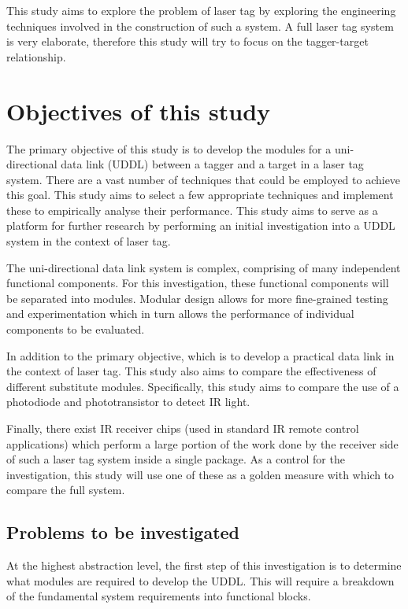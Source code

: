 This study aims to explore the problem of laser tag by exploring the engineering techniques involved in the construction of such a system. A full laser tag system is very elaborate, therefore this study will try to focus on the tagger-target relationship.

\section{Objectives of this study}

The primary objective of this study is to develop the modules for a uni-directional data link (UDDL) between a tagger and a target in a laser tag system. There are a vast number of techniques that could be employed to achieve this goal. This study aims to select a few appropriate techniques and implement these to empirically analyse their performance. This study aims to serve as a platform for further research by performing an initial investigation into a UDDL system in the context of laser tag.

The uni-directional data link system is complex, comprising of many independent functional components. For this investigation, these functional components will be separated into modules. Modular design allows for more fine-grained testing and experimentation which in turn allows the performance of individual components to be evaluated.

In addition to the primary objective, which is to develop a practical data link in the context of laser tag. This study also aims to compare the effectiveness of different substitute modules. Specifically, this study aims to compare the use of a photodiode and phototransistor to detect IR light.

Finally, there exist IR receiver chips (used in standard IR remote control applications) which perform a large portion of the work done by the receiver side of such a laser tag system inside a single package. As a control for the investigation, this study will use one of these as a golden measure with which to compare the full system.

\subsection{Problems to be investigated}

At the highest abstraction level, the first step of this investigation is to determine what modules are required to develop the UDDL. This will require a breakdown of the fundamental system requirements into functional blocks.

